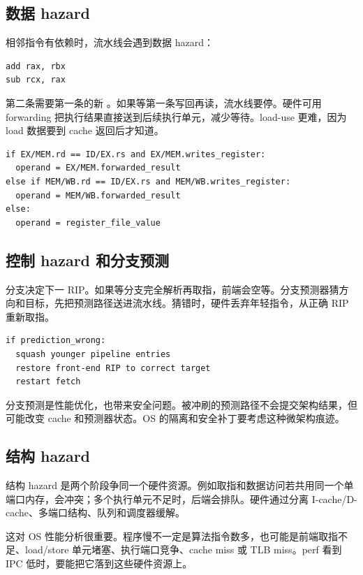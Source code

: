 \subsection{数据 hazard}

相邻指令有依赖时，流水线会遇到数据 hazard：

\begin{lstlisting}
add rax, rbx
sub rcx, rax
\end{lstlisting}

第二条需要第一条的新 。如果等第一条写回再读，流水线要停。硬件可用 forwarding 把执行结果直接送到后续执行单元，减少等待。load-use 更难，因为 load 数据要到 cache 返回后才知道。

\begin{lstlisting}
if EX/MEM.rd == ID/EX.rs and EX/MEM.writes_register:
  operand = EX/MEM.forwarded_result
else if MEM/WB.rd == ID/EX.rs and MEM/WB.writes_register:
  operand = MEM/WB.forwarded_result
else:
  operand = register_file_value
\end{lstlisting}

\subsection{控制 hazard 和分支预测}

分支决定下一 RIP。如果等分支完全解析再取指，前端会空等。分支预测器猜方向和目标，先把预测路径送进流水线。猜错时，硬件丢弃年轻指令，从正确 RIP 重新取指。

\begin{lstlisting}
if prediction_wrong:
  squash younger pipeline entries
  restore front-end RIP to correct target
  restart fetch
\end{lstlisting}

分支预测是性能优化，也带来安全问题。被冲刷的预测路径不会提交架构结果，但可能改变 cache 和预测器状态。OS 的隔离和安全补丁要考虑这种微架构痕迹。

\subsection{结构 hazard}

结构 hazard 是两个阶段争同一个硬件资源。例如取指和数据访问若共用同一个单端口内存，会冲突；多个执行单元不足时，后端会排队。硬件通过分离 I-cache/D-cache、多端口结构、队列和调度器缓解。

这对 OS 性能分析很重要。程序慢不一定是算法指令数多，也可能是前端取指不足、load/store 单元堵塞、执行端口竞争、cache miss 或 TLB miss。perf 看到 IPC 低时，要能把它落到这些硬件资源上。

